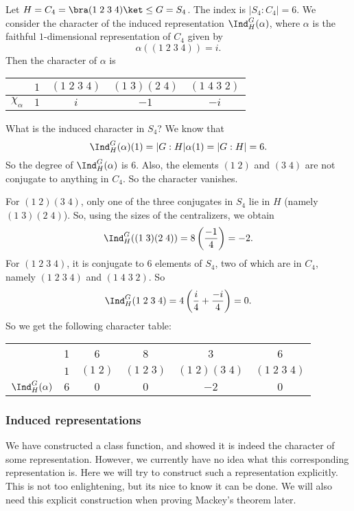 \documentclass[a4paper]{article}
\begin{document}
\begin{eg}
  Let $H = C_4 = \bra (1\; 2\; 3\; 4)\ket \leq G = S_4$. The index is $|S_4: C_4| = 6$. We consider the character of the induced representation $\Ind_H^G (\alpha)$, where $\alpha$ is the faithful $1$-dimensional representation of $C_4$ given by
  \[
    \alpha((1\; 2\; 3\; 4)) = i.
  \]
  Then the character of $\alpha$ is
  \begin{center}
    \begin{tabular}{ccccc}
      \toprule
      & $1$ & $(1\; 2\; 3\; 4)$ & $(1\; 3)(2\; 4)$ & $(1\; 4\; 3\; 2)$\\
      \midrule
      $\chi_\alpha$ & $1$ & $i$ & $-1$ & $-i$\\
      \bottomrule
    \end{tabular}
  \end{center}
  What is the induced character in $S_4$? We know that
  \[
    \Ind_H^G(\alpha)(1) = |G:H| \alpha(1) = |G:H| = 6.
  \]
  So the degree of $\Ind_H^G(\alpha)$ is $6$. Also, the elements $(1\; 2)$ and $(3\; 4)$ are not conjugate to anything in $C_4$. So the character vanishes.

  For $(1\; 2)(3\; 4)$, only one of the three conjugates in $S_4$ lie in $H$ (namely $(1\; 3)(2\; 4)$). So, using the sizes of the centralizers, we obtain
  \[
    \Ind_H^G((1\; 3)(2\; 4)) = 8 \left(\frac{-1}{4}\right) = -2.
  \]
  For $(1\; 2\; 3\; 4)$, it is conjugate to $6$ elements of $S_4$, two of which are in $C_4$, namely $(1\; 2\; 3\; 4)$ and $(1\; 4\; 3\; 2)$. So
  \[
    \Ind_H^G(1\; 2\; 3\; 4) = 4 \left(\frac{i}{4} + \frac{-i}{4}\right) = 0.
  \]
  So we get the following character table:
  \begin{center}
    \begin{tabular}{cccccc}
      \toprule
      & 1 & 6 & 8 & 3 & 6\\
      & $1$ & $(1\; 2)$ & $(1\; 2\; 3)$ & $(1\; 2)(3\; 4)$ & $(1\; 2\; 3\; 4)$\\
      \midrule
      $\Ind_H^G(\alpha)$ & $6$ & $0$ & $0$ & $-2$ & $0$\\
      \bottomrule
    \end{tabular}
  \end{center}
\end{eg}
\subsubsection*{Induced representations}
We have constructed a class function, and showed it is indeed the character of some representation. However, we currently have no idea what this corresponding representation is. Here we will try to construct such a representation explicitly. This is not too enlightening, but its nice to know it can be done. We will also need this explicit construction when proving Mackey's theorem later.
\end{document}
